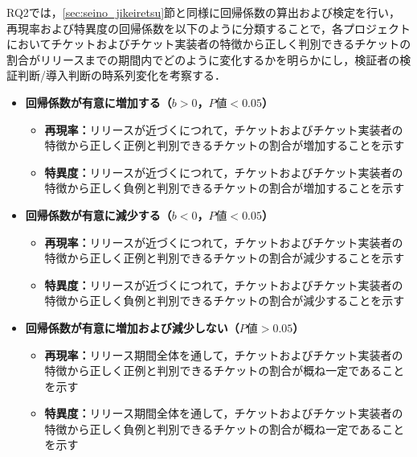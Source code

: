 \documentclass[11pt]{jreport}
\begin{document}

RQ2では，\ref{sec:seino_jikeiretsu}節と同様に回帰係数の算出および検定を行い，再現率および特異度の回帰係数を以下のように分類することで，各プロジェクトにおいてチケットおよびチケット実装者の特徴から正しく判別できるチケットの割合がリリースまでの期間内でどのように変化するかを明らかにし，検証者の検証判断/導入判断の時系列変化を考察する．

\begin{itemize}
  \item \textbf{回帰係数が有意に増加する（$b>0$，$P値<0.05$）}
    \begin{itemize}
      \item \textbf{再現率：}リリースが近づくにつれて，チケットおよびチケット実装者の特徴から正しく正例と判別できるチケットの割合が増加することを示す
      \item \textbf{特異度：}リリースが近づくにつれて，チケットおよびチケット実装者の特徴から正しく負例と判別できるチケットの割合が増加することを示す
    \end{itemize} 
  \item \textbf{回帰係数が有意に減少する（$b<0$，$P値<0.05$）}
    \begin{itemize}
      \item \textbf{再現率：}リリースが近づくにつれて，チケットおよびチケット実装者の特徴から正しく正例と判別できるチケットの割合が減少することを示す
      \item \textbf{特異度：}リリースが近づくにつれて，チケットおよびチケット実装者の特徴から正しく負例と判別できるチケットの割合が減少することを示す
    \end{itemize} 
  \item \textbf{回帰係数が有意に増加および減少しない（$P値>0.05$）}
    \begin{itemize}
      \item \textbf{再現率：}リリース期間全体を通して，チケットおよびチケット実装者の特徴から正しく正例と判別できるチケットの割合が概ね一定であることを示す
      \item \textbf{特異度：}リリース期間全体を通して，チケットおよびチケット実装者の特徴から正しく負例と判別できるチケットの割合が概ね一定であることを示す
    \end{itemize} 
\end{itemize}
\end{document}
